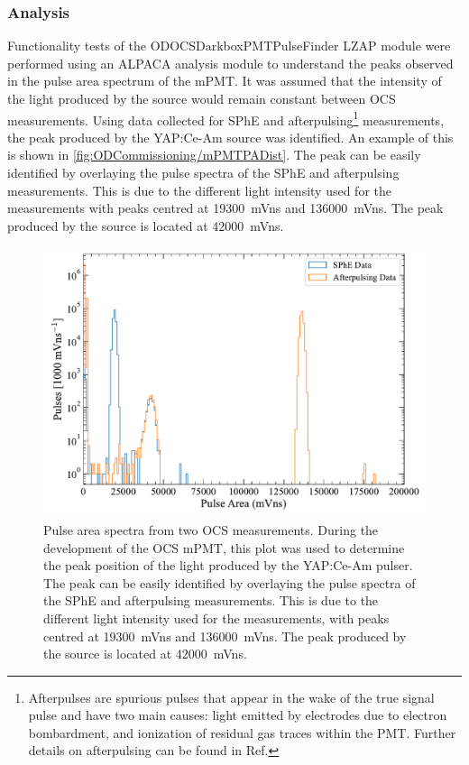 \subsubsection{Analysis}\label{sec:ODCommissioning/MonitoringPMTAnalysis}
Functionality tests of the {\selectfont ODOCSDarkboxPMTPulseFinder} LZAP module were performed using an ALPACA analysis module to understand the peaks observed in the pulse area spectrum of the mPMT. It was assumed that the intensity of the light produced by the source would remain constant between OCS measurements. Using data collected for SPhE and afterpulsing\footnote{Afterpulses are spurious pulses that appear in the wake of the true signal pulse and have two main causes: light emitted by electrodes due to electron bombardment, and ionization of residual gas traces within the PMT. Further details on afterpulsing can be found in Ref.\cite{lkorley:thesis}} measurements, the peak produced by the YAP:Ce-Am source was identified. An example of this is shown in \autoref{fig:ODCommissioning/mPMTPADist}. The peak can be easily identified by overlaying the pulse spectra of the SPhE and afterpulsing measurements. This is due to the different light intensity used for the measurements with peaks centred at 19300~mVns and 136000~mVns. The peak produced by the source is located at 42000~mVns.
\begin{figure}[h!]
    \centering
    \includegraphics[width=0.75\linewidth]{figures/ODCommissioning/mPMT_PulseAreaSpectrum.pdf}
    \caption[Pulse area spectra for two OCS measurements used to determine the position of the light produced by the \textit{in-situ} source.]{Pulse area spectra from two OCS measurements. During the development of the OCS mPMT, this plot was used to determine the peak position of the light produced by the YAP:Ce-Am pulser. The peak can be easily identified by overlaying the pulse spectra of the SPhE and afterpulsing measurements. This is due to the different light intensity used for the measurements, with peaks centred at 19300~mVns and 136000~mVns. The peak produced by the source is located at 42000~mVns.}
    \label{fig:ODCommissioning/mPMTPADist}
\end{figure}
